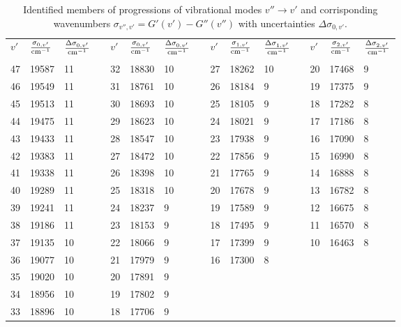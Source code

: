\begin{table}[h]
\centering
\small
\begin{tabular}{
| l| l |l ||c|
| l| l |l ||c|
| l| l |l ||c|
l| l |l |}
\cline{1-7}\cline{9-11}\cline{13-15}
$v'$ & $\frac{\sigma_{0,v'}}{\mathrm{cm^{-1}}}$ & $\frac{\Delta \sigma_{0,v'}}{\mathrm{cm^{-1}}}$&&
$v'$ & $\frac{\sigma_{0,v'}}{\mathrm{cm^{-1}}}$ & $\frac{\Delta \sigma_{0,v'}}{\mathrm{cm^{-1}}}$&&
$v'$ & $\frac{\sigma_{1,v'}}{\mathrm{cm^{-1}}}$ & $\frac{\Delta \sigma_{1,v'}}{\mathrm{cm^{-1}}}$&&
$v'$ & $\frac{\sigma_{2,v'}}{\mathrm{cm^{-1}}}$ & $\frac{\Delta \sigma_{2,v'}}{\mathrm{cm^{-1}}}$\\
&&&&&&&&&&&&&& \\\cline{1-7}\cline{9-11}\cline{13-15}
47 & 19587 & 11 & &32 & 18830 & 10 & &27 & 18262 & 10 & &20 & 17468 & 9 \\ \cline{1-7}\cline{9-11}\cline{13-15}
46 & 19549 & 11 & &31 & 18761 & 10 & &26 & 18184 & 9 & &19 & 17375 & 9 \\ \cline{1-7}\cline{9-11}\cline{13-15}
45 & 19513 & 11 & &30 & 18693 & 10 & &25 & 18105 & 9 & &18 & 17282 & 8 \\ \cline{1-7}\cline{9-11}\cline{13-15}
44 & 19475 & 11 & &29 & 18623 & 10 & &24 & 18021 & 9 & &17 & 17186 & 8 \\ \cline{1-7}\cline{9-11}\cline{13-15}
43 & 19433 & 11 & &28 & 18547 & 10 & &23 & 17938 & 9 & &16 & 17090 & 8 \\ \cline{1-7}\cline{9-11}\cline{13-15}
42 & 19383 & 11 & &27 & 18472 & 10 & &22 & 17856 & 9 & &15 & 16990 & 8 \\ \cline{1-7}\cline{9-11}\cline{13-15}
41 & 19338 & 11 & &26 & 18398 & 10 & &21 & 17765 & 9 & &14 & 16888 & 8 \\ \cline{1-7}\cline{9-11}\cline{13-15}
40 & 19289 & 11 & &25 & 18318 & 10 & &20 & 17678 & 9 & &13 & 16782 & 8 \\ \cline{1-7}\cline{9-11}\cline{13-15}
39 & 19241 & 11 & &24 & 18237 & 9 & &19 & 17589 & 9 & &12 & 16675 & 8 \\ \cline{1-7}\cline{9-11}\cline{13-15}
38 & 19186 & 11 & &23 & 18153 & 9 & &18 & 17495 & 9 & &11 & 16570 & 8 \\ \cline{1-7}\cline{9-11}\cline{13-15}
37 & 19135 & 10 & &22 & 18066 & 9 & &17 & 17399 & 9 & &10 & 16463 & 8 \\ \cline{1-7}\cline{9-11}\cline{13-15}
36 & 19077 & 10 & &21 & 17979 & 9 & &16 & 17300 & 8 \\ \cline{1-7}\cline{9-11}
35 & 19020 & 10 & &20 & 17891 & 9 \\ \cline{1-7}
34 & 18956 & 10 & &19 & 17802 & 9 \\ \cline{1-7}
33 & 18896 & 10 & &18 & 17706 & 9 \\ \cline{1-7}
\end{tabular}
\caption{Identified members of progressions of vibrational modes $v'' \rightarrow v'$ 
and corrisponding wavenumbers $\sigma_{v'', v'} = G'(v') - G''(v'')$ with uncertainties
$\Delta \sigma_{0, v'}$. }
\label{tab:prog}
\end{table}

